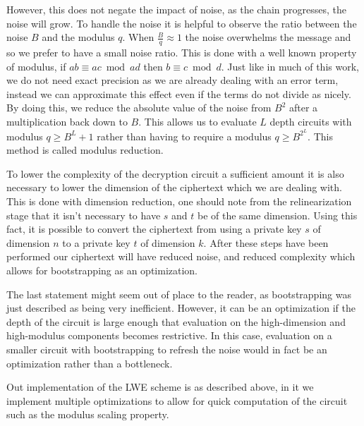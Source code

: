 \documentclass[letterpaper,twocolumn,10pt]{article}
\begin{document}
However, this does not negate the impact of noise, as the chain progresses, the noise will grow. To handle the noise it is helpful to observe the ratio between the noise $B$ and the modulus $q$. When $\frac{B}{q} \approx 1$ the noise overwhelms the message and so we prefer to have a small noise ratio. This is done with a well known property of modulus, if $ab \equiv ac \bmod ad$ then $b \equiv c \bmod d$. Just like in much of this work, we do not need exact precision as we are already dealing with an error term, instead we can approximate this effect even if
the terms do not divide as nicely. By doing this, we reduce the absolute value of the noise from $B^2$ after a multiplication back down to $B$. This allows us to evaluate $L$ depth circuits with modulus $q \geq B^L+1$ rather than having to require a modulus $q \geq B^{2^L}$. This method is called modulus reduction.

To lower the complexity of the decryption circuit a sufficient amount it is also necessary to lower the dimension of the ciphertext which we are dealing with. This is done with dimension reduction, one should note from the relinearization stage that it isn't necessary to have $s$ and $t$ be of the same dimension. Using this fact, it is possible to convert the ciphertext from using a private key $s$ of dimension $n$ to a private key $t$ of dimension $k$. After these steps have been performed our ciphertext will have reduced noise, and reduced complexity which allows for bootstrapping as an optimization.

The last statement might seem out of place to the reader, as bootstrapping was just described as being very inefficient. However, it can be an optimization if the depth of the circuit is large enough that evaluation on the high-dimension and high-modulus components becomes restrictive. In this case, evaluation on a smaller circuit with bootstrapping to refresh the noise would in fact be an optimization rather than a bottleneck.

Out implementation of the LWE scheme is as described above, in it we implement multiple optimizations to allow for quick computation of the circuit such as the modulus scaling property.


\end{document}
